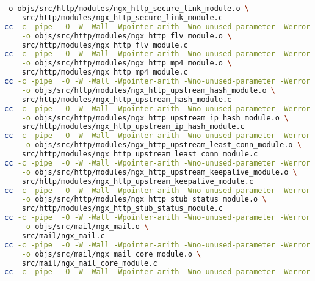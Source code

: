 \begin{lstlisting}[language=bash]
	-o objs/src/http/modules/ngx_http_secure_link_module.o \
	src/http/modules/ngx_http_secure_link_module.c
cc -c -pipe  -O -W -Wall -Wpointer-arith -Wno-unused-parameter -Werror -g  -I src/core -I src/event -I src/event/modules -I src/os/unix -I objs -I src/http -I src/http/modules \
	-o objs/src/http/modules/ngx_http_flv_module.o \
	src/http/modules/ngx_http_flv_module.c
cc -c -pipe  -O -W -Wall -Wpointer-arith -Wno-unused-parameter -Werror -g  -I src/core -I src/event -I src/event/modules -I src/os/unix -I objs -I src/http -I src/http/modules \
	-o objs/src/http/modules/ngx_http_mp4_module.o \
	src/http/modules/ngx_http_mp4_module.c
cc -c -pipe  -O -W -Wall -Wpointer-arith -Wno-unused-parameter -Werror -g  -I src/core -I src/event -I src/event/modules -I src/os/unix -I objs -I src/http -I src/http/modules \
	-o objs/src/http/modules/ngx_http_upstream_hash_module.o \
	src/http/modules/ngx_http_upstream_hash_module.c
cc -c -pipe  -O -W -Wall -Wpointer-arith -Wno-unused-parameter -Werror -g  -I src/core -I src/event -I src/event/modules -I src/os/unix -I objs -I src/http -I src/http/modules \
	-o objs/src/http/modules/ngx_http_upstream_ip_hash_module.o \
	src/http/modules/ngx_http_upstream_ip_hash_module.c
cc -c -pipe  -O -W -Wall -Wpointer-arith -Wno-unused-parameter -Werror -g  -I src/core -I src/event -I src/event/modules -I src/os/unix -I objs -I src/http -I src/http/modules \
	-o objs/src/http/modules/ngx_http_upstream_least_conn_module.o \
	src/http/modules/ngx_http_upstream_least_conn_module.c
cc -c -pipe  -O -W -Wall -Wpointer-arith -Wno-unused-parameter -Werror -g  -I src/core -I src/event -I src/event/modules -I src/os/unix -I objs -I src/http -I src/http/modules \
	-o objs/src/http/modules/ngx_http_upstream_keepalive_module.o \
	src/http/modules/ngx_http_upstream_keepalive_module.c
cc -c -pipe  -O -W -Wall -Wpointer-arith -Wno-unused-parameter -Werror -g  -I src/core -I src/event -I src/event/modules -I src/os/unix -I objs -I src/http -I src/http/modules \
	-o objs/src/http/modules/ngx_http_stub_status_module.o \
	src/http/modules/ngx_http_stub_status_module.c
cc -c -pipe  -O -W -Wall -Wpointer-arith -Wno-unused-parameter -Werror -g  -I src/core -I src/event -I src/event/modules -I src/os/unix -I objs -I src/mail \
	-o objs/src/mail/ngx_mail.o \
	src/mail/ngx_mail.c
cc -c -pipe  -O -W -Wall -Wpointer-arith -Wno-unused-parameter -Werror -g  -I src/core -I src/event -I src/event/modules -I src/os/unix -I objs -I src/mail \
	-o objs/src/mail/ngx_mail_core_module.o \
	src/mail/ngx_mail_core_module.c
cc -c -pipe  -O -W -Wall -Wpointer-arith -Wno-unused-parameter -Werror -g  -I src/core -I src/event -I src/event/modules -I src/os/unix -I objs -I src/mail \

\end{lstlisting}
